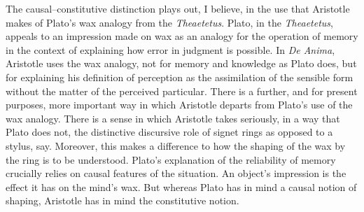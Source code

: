 \documentclass[12pt]{article}
\begin{document}
The causal--constitutive distinction plays out, I believe, in the use that Aristotle makes of Plato's wax analogy from the \emph{Theaetetus}. Plato, in the \emph{Theaetetus}, appeals to an impression made on wax as an analogy for the operation of memory in the context of explaining how error in judgment is possible. In \emph{De Anima}, Aristotle uses the wax analogy, not for memory and knowledge as Plato does, but for explaining his definition of perception as the assimilation of the sensible form without the matter of the perceived particular. There is a further, and for present purposes, more important way in which Aristotle departs from Plato's use of the wax analogy. There is a sense in which Aristotle takes seriously, in a way that Plato does not, the distinctive discursive role of signet rings as opposed to a stylus, say. Moreover, this makes a difference to how the shaping of the wax by the ring is to be understood. Plato’s explanation of the reliability of memory crucially relies on causal features of the situation. An object’s impression is the effect it has on the mind’s wax. But whereas Plato has in mind a causal notion of shaping, Aristotle has in mind the constitutive notion. 

%
\end{document}

